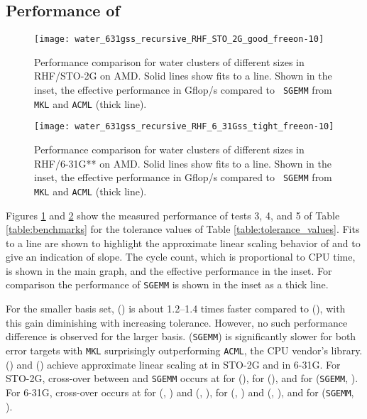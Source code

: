 \subsection{Performance of \SpAMM{}}

\begin{figure}
\texttt{[image: water\_631gss\_recursive\_RHF\_STO\_2G\_good\_freeon-10]}
\caption{\label{fig:water_STO2G_AMD} Performance comparison for water clusters
of different sizes in RHF/STO-2G on AMD. Solid lines show fits to a line.
Shown in the inset, the effective performance in Gflop/s compared to {\tt
SGEMM} from {\tt MKL} and {\tt ACML} (thick line).}
\end{figure}

\begin{figure}
\texttt{[image: water\_631gss\_recursive\_RHF\_6\_31Gss\_tight\_freeon-10]}
\caption{\label{fig:water_631gss_AMD} Performance comparison for water clusters
of different sizes in RHF/6-31G** on AMD. Solid lines show fits to a line.
Shown in the inset, the effective performance in Gflop/s compared to {\tt
SGEMM} from {\tt MKL} and {\tt ACML} (thick line).}
\end{figure}

Figures \ref{fig:water_STO2G_AMD} and \ref{fig:water_631gss_AMD} show the
measured performance of tests 3, 4, and 5 of Table \ref{table:benchmarks} for
the tolerance values of Table \ref{table:tolerance_values}. Fits to a line are
shown to highlight the approximate linear scaling behavior of \SpAMM{} and to
give an indication of slope. The cycle count, which is proportional to CPU
time, is shown in the main graph, and the effective performance in the inset.
For comparison the performance of {\tt SGEMM} is shown in the inset as a thick
line.

For the smaller basis set, \SpAMM{}() is about 1.2--1.4 times
faster compared to \SpAMM{}(), with this gain diminishing with
increasing tolerance. However, no such performance difference is observed for
the larger basis. \SpAMM{}({\tt SGEMM}) is significantly slower for both error
targets with {\tt MKL} surprisingly outperforming {\tt ACML}, the CPU vendor's
library. \SpAMM{}() and \SpAMM{}() achieve
approximate linear scaling at  in STO-2G and  in
6-31G. For STO-2G, cross-over between \SpAMM{} and {\tt SGEMM} occurs
at  for \SpAMM{}(),  for
\SpAMM{}(), and  for \SpAMM{}({\tt SGEMM}, ). For 6-31G, cross-over occurs at  for \SpAMM{}(, ) and \SpAMM{}(, ),  for \SpAMM{}(,
) and \SpAMM{}(, ),
and  for \SpAMM{}({\tt SGEMM}, ).

